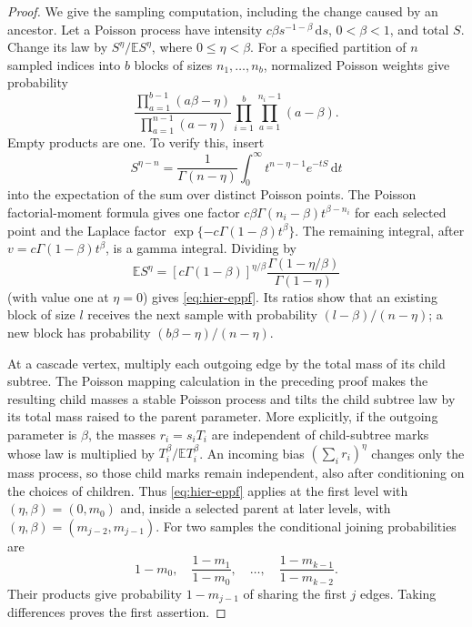 \documentclass[11pt,a4paper]{article}
\numberwithin{equation}{section}
\theoremstyle{definition}
\theoremstyle{remark}
\newcommand{\E}{\mathbb E}
\newcommand{\dd}{\mathrm d}
\begin{document}
\begin{proof}
We give the sampling computation, including the change caused by an
ancestor.  Let a Poisson process have intensity
$c\beta s^{-1-\beta}\,\dd s$, $0<\beta<1$, and total $S$.  Change its law by
$S^\eta/\E S^\eta$, where $0\le\eta<\beta$.  For a specified partition of
$n$ sampled indices into $b$ blocks of sizes $n_1,\ldots,n_b$, normalized
Poisson weights give probability
\begin{equation}
 \frac{\prod_{a=1}^{b-1}(a\beta-\eta)}
      {\prod_{a=1}^{n-1}(a-\eta)}
 \prod_{i=1}^b\prod_{a=1}^{n_i-1}(a-\beta).
 \label{eq:hier-eppf}
\end{equation}
Empty products are one.  To verify this, insert
\[
 S^{\eta-n}=\frac1{\Gamma(n-\eta)}
       \int_0^\infty t^{n-\eta-1}e^{-tS}\,\dd t
\]
into the expectation of the sum over distinct Poisson points.  The Poisson
factorial-moment formula gives one factor
$c\beta\Gamma(n_i-\beta)t^{\beta-n_i}$ for each selected point and the
Laplace factor $\exp\{-c\Gamma(1-\beta)t^\beta\}$.  The remaining integral,
after $v=c\Gamma(1-\beta)t^\beta$, is a gamma integral.  Dividing by
\[
 \E S^\eta=
 [c\Gamma(1-\beta)]^{\eta/\beta}
 \frac{\Gamma(1-\eta/\beta)}{\Gamma(1-\eta)}
\]
(with value one at $\eta=0$) gives \eqref{eq:hier-eppf}.
Its ratios show that an existing block of size $l$ receives the next sample
with probability $(l-\beta)/(n-\eta)$; a new block has probability
$(b\beta-\eta)/(n-\eta)$.

At a cascade vertex, multiply each outgoing edge by the total mass of its
child subtree.  The Poisson mapping calculation in the preceding proof
makes the resulting child masses a stable Poisson process and tilts the
child subtree law by its total mass raised to the parent parameter.
More explicitly, if the outgoing parameter is $\beta$, the masses
$r_i=s_iT_i$ are independent of child-subtree marks whose law is multiplied
by $T_i^\beta/\E T_i^\beta$.  An incoming bias
$(\sum_i r_i)^\eta$ changes only the mass process, so those child marks
remain independent, also after conditioning on the choices of children.
Thus \eqref{eq:hier-eppf} applies at the first level with
$(\eta,\beta)=(0,m_0)$ and, inside a selected parent at later levels, with
$(\eta,\beta)=(m_{j-2},m_{j-1})$.  For two samples the conditional joining
probabilities are
\[
 1-m_0,\quad \frac{1-m_1}{1-m_0},\quad\ldots,
 \quad\frac{1-m_{k-1}}{1-m_{k-2}}.
\]
Their products give probability $1-m_{j-1}$ of sharing the first $j$
edges.  Taking differences proves the first assertion.


\end{proof}
\end{document}
